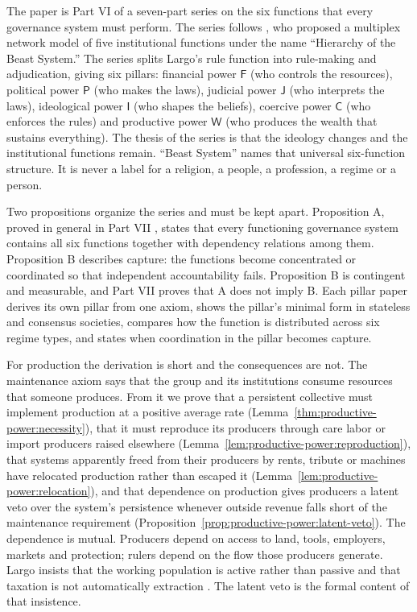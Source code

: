 \documentclass[11pt,letterpaper]{article}
\theoremstyle{definition}
\theoremstyle{remark}
\newcommand{\pF}{\mathsf{F}}
\newcommand{\pP}{\mathsf{P}}
\newcommand{\pJ}{\mathsf{J}}
\newcommand{\pI}{\mathsf{I}}
\newcommand{\pC}{\mathsf{C}}
\newcommand{\pW}{\mathsf{W}}
\begin{document}
The paper is Part VI of a seven-part series on the six functions that every governance system must perform. The series follows \citet{largo2026hbs}, who proposed a multiplex network model of five institutional functions under the name ``Hierarchy of the Beast System.'' The series splits Largo's rule function into rule-making and adjudication, giving six pillars: financial power $\pF$ (who controls the resources), political power $\pP$ (who makes the laws), judicial power $\pJ$ (who interprets the laws), ideological power $\pI$ (who shapes the beliefs), coercive power $\pC$ (who enforces the rules) and productive power $\pW$ (who produces the wealth that sustains everything). The thesis of the series is that the ideology changes and the institutional functions remain. ``Beast System'' names that universal six-function structure. It is never a label for a religion, a people, a profession, a regime or a person.

Two propositions organize the series and must be kept apart. Proposition A, proved in general in Part VII \citep{long2026formalized}, states that every functioning governance system contains all six functions together with dependency relations among them. Proposition B describes capture: the functions become concentrated or coordinated so that independent accountability fails. Proposition B is contingent and measurable, and Part VII proves that A does not imply B. Each pillar paper derives its own pillar from one axiom, shows the pillar's minimal form in stateless and consensus societies, compares how the function is distributed across six regime types, and states when coordination in the pillar becomes capture.

For production the derivation is short and the consequences are not. The maintenance axiom says that the group and its institutions consume resources that someone produces. From it we prove that a persistent collective must implement production at a positive average rate (Lemma~\ref{thm:productive-power:necessity}), that it must reproduce its producers through care labor or import producers raised elsewhere (Lemma~\ref{lem:productive-power:reproduction}), that systems apparently freed from their producers by rents, tribute or machines have relocated production rather than escaped it (Lemma~\ref{lem:productive-power:relocation}), and that dependence on production gives producers a latent veto over the system's persistence whenever outside revenue falls short of the maintenance requirement (Proposition~\ref{prop:productive-power:latent-veto}). The dependence is mutual. Producers depend on access to land, tools, employers, markets and protection; rulers depend on the flow those producers generate. Largo insists that the working population is active rather than passive and that taxation is not automatically extraction \citep{largo2026hbs}. The latent veto is the formal content of that insistence.
\end{document}
